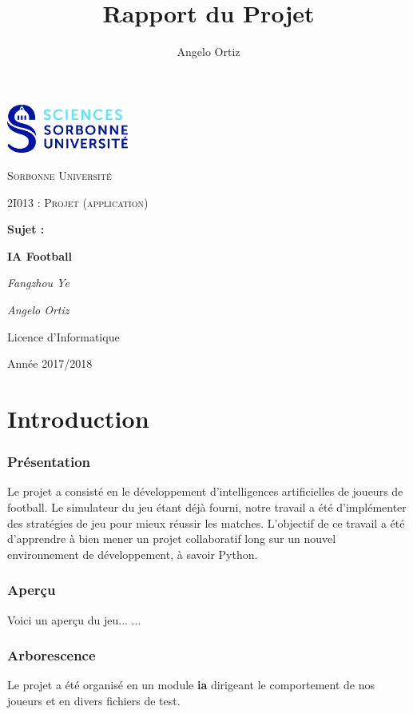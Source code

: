 \documentclass[12pt,a4paper]{article}
\author{Angelo Ortiz}
\title{Rapport du Projet}
\begin{document}
\begin{titlepage}
  \centering
  \includegraphics[width=0.30\textwidth]{logo.jpg}\par\vspace{1cm}
  {\scshape\LARGE Sorbonne Universit\'e\par}
  \vspace{1cm}
  {\scshape\Large 2I013 : Projet (application)\par}
  \vspace{1.5cm}
  {\Large \bfseries Sujet :\par}
  {\huge\bfseries IA Football\par}
  \vspace{2cm}
  {\Large\itshape Fangzhou Ye\par}
  {\Large\itshape Angelo Ortiz\par}
  \vfill
  
  {\large Licence d'Informatique\par}
  {\large Ann\'ee 2017/2018\par}
\end{titlepage}
 
\tableofcontents
  
\newpage
  
\part*{Introduction}
\section*{Pr\'esentation}
Le projet a consist\'e en le d\'eveloppement d'intelligences artificielles de 
joueurs de football. Le simulateur du jeu \'etant d\'ej\`a fourni, notre 
travail a \'et\'e d'impl\'ementer des strat\'egies de jeu pour mieux r\'eussir 
les matches.
L’objectif de ce travail a \'et\'e d'apprendre \`a bien mener un projet 
collaboratif long sur un nouvel environnement de d\'eveloppement, \`a savoir 
Python.
\section*{Aper\c{c}u}
Voici un aper\c{c}u du jeu...
...
\section*{Arborescence}
Le projet a \'et\'e organis\'e en un module {\bfseries ia} dirigeant le 
comportement de nos joueurs et en divers fichiers de test.
\end{document}
